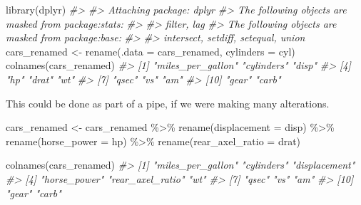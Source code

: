 \documentclass[
  12pt,
]{book}
\newenvironment{Shaded}{\begin{snugshade}}{\end{snugshade}}
\newcommand{\AttributeTok}[1]{\textcolor[rgb]{0.77,0.63,0.00}{#1}}
\newcommand{\CommentTok}[1]{\textcolor[rgb]{0.56,0.35,0.01}{\textit{#1}}}
\newcommand{\FunctionTok}[1]{\textcolor[rgb]{0.00,0.00,0.00}{#1}}
\newcommand{\NormalTok}[1]{#1}
\newcommand{\OtherTok}[1]{\textcolor[rgb]{0.56,0.35,0.01}{#1}}
\newcommand{\SpecialCharTok}[1]{\textcolor[rgb]{0.00,0.00,0.00}{#1}}
\begin{document}
\begin{Shaded}
\begin{Highlighting}[]
\FunctionTok{library}\NormalTok{(dplyr)}
\CommentTok{\#\textgreater{} }
\CommentTok{\#\textgreater{} Attaching package: \textquotesingle{}dplyr\textquotesingle{}}
\CommentTok{\#\textgreater{} The following objects are masked from \textquotesingle{}package:stats\textquotesingle{}:}
\CommentTok{\#\textgreater{} }
\CommentTok{\#\textgreater{}     filter, lag}
\CommentTok{\#\textgreater{} The following objects are masked from \textquotesingle{}package:base\textquotesingle{}:}
\CommentTok{\#\textgreater{} }
\CommentTok{\#\textgreater{}     intersect, setdiff, setequal, union}
\NormalTok{cars\_renamed }\OtherTok{\textless{}{-}} \FunctionTok{rename}\NormalTok{(}\AttributeTok{.data =}\NormalTok{ cars\_renamed, }\AttributeTok{cylinders =}\NormalTok{ cyl)}
\FunctionTok{colnames}\NormalTok{(cars\_renamed)}
\CommentTok{\#\textgreater{}  [1] "miles\_per\_gallon" "cylinders"        "disp"            }
\CommentTok{\#\textgreater{}  [4] "hp"               "drat"             "wt"              }
\CommentTok{\#\textgreater{}  [7] "qsec"             "vs"               "am"              }
\CommentTok{\#\textgreater{} [10] "gear"             "carb"}
\end{Highlighting}
\end{Shaded}

This could be done as part of a pipe, if we were making many alterations.

\begin{Shaded}
\begin{Highlighting}[]
\NormalTok{cars\_renamed }\OtherTok{\textless{}{-}}\NormalTok{ cars\_renamed }\SpecialCharTok{\%\textgreater{}\%} 
  \FunctionTok{rename}\NormalTok{(}\AttributeTok{displacement =}\NormalTok{ disp) }\SpecialCharTok{\%\textgreater{}\%} 
  \FunctionTok{rename}\NormalTok{(}\AttributeTok{horse\_power =}\NormalTok{ hp) }\SpecialCharTok{\%\textgreater{}\%} 
  \FunctionTok{rename}\NormalTok{(}\AttributeTok{rear\_axel\_ratio =}\NormalTok{ drat)}

\FunctionTok{colnames}\NormalTok{(cars\_renamed)}
\CommentTok{\#\textgreater{}  [1] "miles\_per\_gallon" "cylinders"        "displacement"    }
\CommentTok{\#\textgreater{}  [4] "horse\_power"      "rear\_axel\_ratio"  "wt"              }
\CommentTok{\#\textgreater{}  [7] "qsec"             "vs"               "am"              }
\CommentTok{\#\textgreater{} [10] "gear"             "carb"}
\end{Highlighting}
\end{Shaded}
\end{document}
